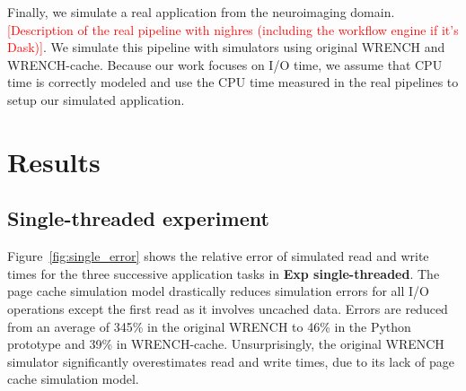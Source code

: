 \documentclass[conference]{IEEEtran}
\begin{document}
            Finally, we simulate a real application from the neuroimaging
            domain. \textcolor{red}{[Description of the real pipeline with
            nighres (including the workflow engine if it's Dask)]}.
            We simulate this pipeline with simulators using original WRENCH
            and WRENCH-cache. Because our work focuses on I/O time, we
            assume that CPU time is correctly modeled and use the CPU time
            measured in the real pipelines to setup our simulated
            application.

    \section{Results}
    \label{results}

        \subsection{Single-threaded experiment}

        Figure~\ref{fig:single_error} shows the relative error of simulated
        read and write times for the three successive application tasks in \textbf{Exp single-threaded}. The
        page cache simulation model drastically reduces simulation errors
        for all I/O operations except the first read as it involves
        uncached data. Errors are reduced from an average of 345\%
        in the original WRENCH to 46\% in the Python prototype and 39\% in WRENCH-cache.
        Unsurprisingly, the original WRENCH simulator significantly overestimates
        read and write times, due to its lack of page cache simulation
        model.
\end{document}
